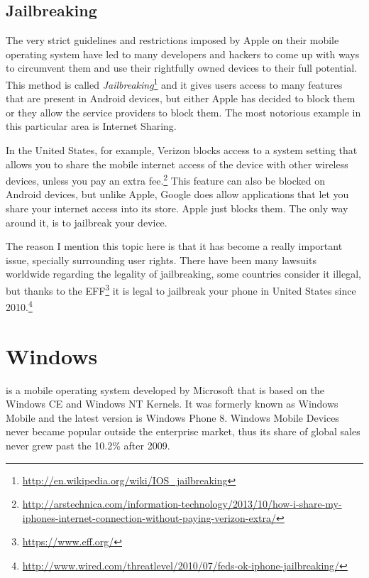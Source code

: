 \subsection{Jailbreaking}
The very strict guidelines and restrictions imposed by Apple on their mobile operating system have led to many developers and hackers to come up with ways to circumvent them and use their rightfully owned devices to their full potential. This method is called \emph{Jailbreaking}\footnote{\url{http://en.wikipedia.org/wiki/IOS_jailbreaking}}  and it gives users access to many features that are present in Android devices, but either Apple has decided to block them or they allow the service providers to block them. The most notorious example in this particular area is Internet Sharing. 


In the United States, for example, Verizon blocks access to a system setting that allows you to share the mobile internet access of the device with other wireless devices, unless you pay an extra fee.\footnote{\url{http://arstechnica.com/information-technology/2013/10/how-i-share-my-iphones-internet-connection-without-paying-verizon-extra/}} This feature can also be blocked on Android devices, but unlike Apple, Google does allow applications that let you share your internet access into its store. Apple just blocks them. The only way around it, is to jailbreak your device.

The reason I mention this topic here is that it has become a really important issue, specially surrounding user rights. There have been many lawsuits worldwide regarding the legality of jailbreaking, some countries consider it illegal, but thanks to the EFF\footnote{\url{https://www.eff.org/}} it is legal to jailbreak your phone in United States since 2010.\footnote{\url{http://www.wired.com/threatlevel/2010/07/feds-ok-iphone-jailbreaking/}}      

\section{Windows}
 is a mobile operating system developed by Microsoft that is based on the Windows CE and Windows NT Kernels. It was formerly known as Windows Mobile and the latest version is Windows Phone 8. Windows Mobile Devices never became popular outside the enterprise market, thus its share of global sales never grew past the 10.2\% after 2009. 


